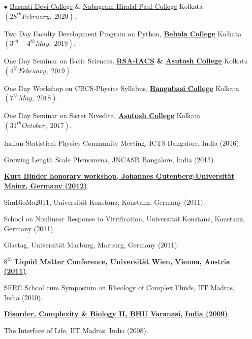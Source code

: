 \documentclass[margin,line]{res}
\newenvironment{list2}{
  \begin{list}{$\bullet$}{%
      \setlength{\itemsep}{0in}
      \setlength{\parsep}{0in} \setlength{\parskip}{0in}
      \setlength{\topsep}{0in} \setlength{\partopsep}{0in} 
      \setlength{\leftmargin}{0.2in}}}{\end{list}}
\begin{document}
\begin{resume}
\begin{list2}
{{      \href{https://www.basantidevicollege.edu.in/}{Basanti Devi 
      College} \& \href{http://www.hiralalpaulcollege.ac.in/new/index.php}{Nabagram Hiralal Paul College}} Kolkata $(28^{th} February,\; 2020)$.}
\item {\small Two Day Faculty Development Program on Python, {\bf \href{https://www.behalacollege.in/Home}{Behala College}} Kolkata $(3^{rd}-4^{th} 
      May,\; 2019)$.}
\item {\small One Day Seminar on Basic Sciences, {\bf \href{https://www.facebook.com/RSAIACS/}{RSA-IACS} \& 
      \href{https://asutoshcollege.in/}{Asutosh College}} Kolkata $(4^{th} February,\; 2019)$.}
\item {\small One Day Workshop on CBCS-Physics Syllabus, {\bf \href{https://www.bangabasi.ac.in}{Bangabasi College}} Kolkata $(7^{th} May,\; 2018)$.}
\item {\small One Day Seminar on Sister Nivedita, {\bf \href{https://asutoshcollege.in/}{Asutosh College}} Kolkata $(31^{th} October,\; 2017)$.} 
\item {\small Indian Statistical Physics Community Meeting, ICTS Bangalore, India (2016).}
\item {\small Growing Length Scale Phenomena, JNCASR Bangalore, India (2015).}
\item {\small \href{http://www.slideshare.net/AmitBhattacharjee14/flow-reversal-and-bauschinger-effect-in-a-glass-forming-liquid}{\bf Kurt Binder 
      honorary workshop, Johannes Gutenberg-Universit\"{a}t Mainz, Germany (2012)}.}
\item {\small SimBioMa2011, Universit\"at Konstanz, Konstanz, Germany (2011).}
\item {\small School on Nonlinear Response to Vitrification, Universit\"at Konstanz, Konstanz, Germany (2011).}
\item {\small Glastag, Universit\"at Marburg, Marburg, Germany (2011).}
\item {\small \href{https://www.slideshare.net/AmitBhattacharjee14/poster-lmc-wien-2011-on-colloidal-glassy-rheology}{\bf $8^{th}$ Liquid Matter 
      Conference, Universit\"at Wien, Vienna, Austria (2011)}.}
\item {\small SERC School cum Symposium on Rheology of Complex Fluids, IIT Madras, India (2010).}
\item {\small \href{http://www.slideshare.net/AmitBhattacharjee14/textures-and-topological-defects-in-nematic-phases}{\bf Disorder, Complexity 
      \& Biology II, BHU Varanasi, India (2009)}.}
\item {\small The Interface of Life, IIT Madras, India (2008).} 

\end{list2}
\end{resume}
\end{document}
